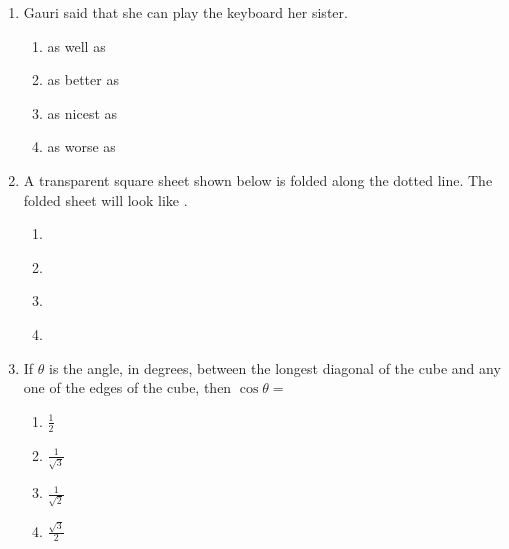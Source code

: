 \documentclass[journal,12pt,onecolumn]{IEEEtran}
\theoremstyle{remark}
\begin{document}
\begin{enumerate}
    \item Gauri said that she can play the keyboard {\underline{\hspace{2cm}}} her sister.
    \begin{enumerate}
        \item as well as
        \item as better as
        \item as nicest as
        \item as worse as
    \end{enumerate}

    \item A transparent square sheet shown below is folded along the dotted line. The folded sheet will look like {\underline{\hspace{2cm}}}.
     \begin{figure}[H]
        \centering
    \end{figure}
       
   
    \begin{enumerate}
        \item  \begin{figure}[H]
        
    \end{figure}
       
        \item  \begin{figure}[H]
        
    \end{figure}
       
        \item  \begin{figure}[H]
    \end{figure}
       
        \item  \begin{figure}[H]
    \end{figure}
       
    \end{enumerate}
    
    \item If $\theta$ is the angle, in degrees, between the longest diagonal of the cube and any one of the edges of the cube, then $\cos \theta =$
    \begin{enumerate}
        \item $\frac{1}{2}$
        \item $\frac{1}{\sqrt{3}}$
        \item $\frac{1}{\sqrt{2}}$
        \item $\frac{\sqrt{3}}{2}$
    \end{enumerate}


\end{enumerate}
\end{document}
